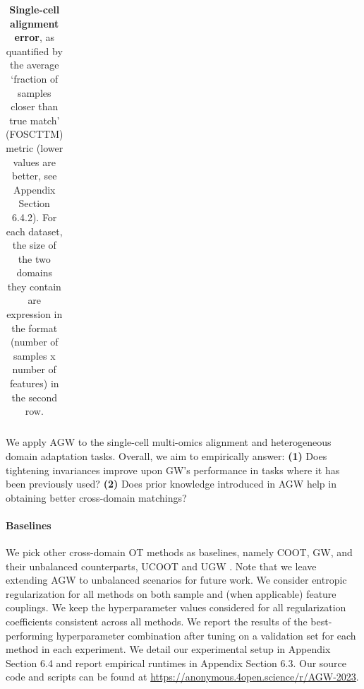 \begin{table}[t]
\begin{center}
{\begin{tabular}{lccccccc}
\end{tabular}}
\end{center}
\caption{\label{table:scCells} \textbf{Single-cell alignment error},
as quantified by the average `fraction of samples closer than true match'
(FOSCTTM) metric (lower values are better, see Appendix Section 6.4.2).
For each dataset, the size of the two domains they contain are expression in the format
(number of samples x number of features) in the second row.
}
\end{table}

We apply AGW to the single-cell multi-omics alignment and heterogeneous domain adaptation tasks.
Overall, we aim to empirically answer:
\textbf{(1)} Does tightening invariances improve upon GW's performance in tasks where
it has been previously used? \textbf{(2)} Does prior knowledge introduced in AGW help
in obtaining better cross-domain matchings?


\paragraph{Baselines} We pick other cross-domain OT methods as baselines, namely COOT, GW,
and their unbalanced counterparts, UCOOT \citep{Tran23} and UGW \citep{Sejourne20}.
Note that we leave extending AGW to unbalanced scenarios for future work.
We consider entropic regularization for all methods on both sample and
(when applicable) feature couplings. We keep the hyperparameter values considered
for all regularization coefficients consistent across all methods. We report the results of
the best-performing hyperparameter combination after tuning on a validation set for each method
in each experiment. We detail our experimental setup in Appendix Section 6.4 and
report empirical runtimes in Appendix Section 6.3. Our source code and scripts can be found at
\url{https://anonymous.4open.science/r/AGW-2023}.

